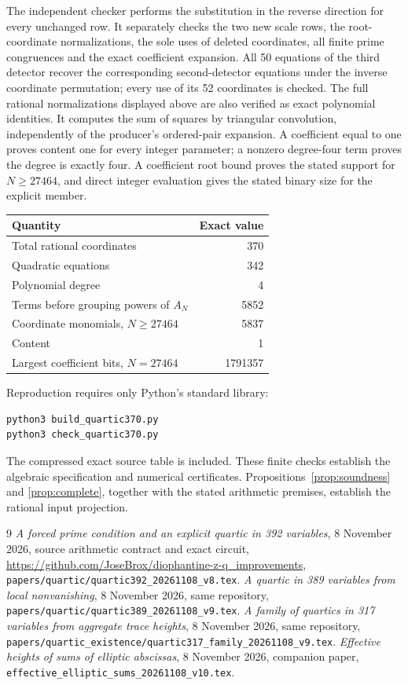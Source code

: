 \documentclass[11pt,a4paper]{article}
\theoremstyle{remark}\newtheorem{remark}[theorem]{Remark}
\begin{document}
The independent checker performs the substitution in the
reverse direction for every unchanged row. It separately
checks the two new scale rows, the root-coordinate
normalizations, the sole uses of deleted coordinates,
all finite prime congruences and the exact coefficient
expansion. All 50 equations of the third detector recover
the corresponding second-detector equations under the inverse
coordinate permutation; every use of its 52 coordinates is
checked. The full rational normalizations displayed above
are also verified as exact polynomial identities.
It computes the sum of squares by triangular
convolution, independently of the producer's ordered-pair
expansion. A coefficient equal to one proves content one
for every integer parameter; a nonzero degree-four term
proves the degree is exactly four. A coefficient root
bound proves the stated support for $N\ge27464$, and direct
integer evaluation gives the stated binary size for the
explicit member.

\begin{center}
\begin{tabular}{lr}
\toprule
Quantity & Exact value\\
\midrule
Total rational coordinates &370\\
Quadratic equations &342\\
Polynomial degree &4\\
Terms before grouping powers of $A_N$ &5852\\
Coordinate monomials, $N\ge27464$ &5837\\
Content &1\\
Largest coefficient bits, $N=27464$ &1791357\\
\bottomrule
\end{tabular}
\end{center}

Reproduction requires only Python's standard library:
\begin{verbatim}
python3 build_quartic370.py
python3 check_quartic370.py
\end{verbatim}
The compressed exact source table is included. These finite
checks establish the algebraic specification and numerical
certificates. Propositions~\ref{prop:soundness} and
\ref{prop:complete}, together with the stated arithmetic
premises, establish the rational input projection.

\begin{thebibliography}{9}
\emph{A forced prime condition and an explicit quartic in 392 variables},
8 November 2026, source arithmetic contract and exact circuit,
\url{https://github.com/JoseBrox/diophantine-z-q_improvements},
\nolinkurl{papers/quartic/quartic392_20261108_v8.tex}.
\emph{A quartic in 389 variables from local nonvanishing},
8 November 2026, same repository,
\nolinkurl{papers/quartic/quartic389_20261108_v9.tex}.
\emph{A family of quartics in 317 variables from aggregate trace heights},
8 November 2026, same repository,
\nolinkurl{papers/quartic_existence/quartic317_family_20261108_v9.tex}.
\emph{Effective heights of sums of elliptic abscissas},
8 November 2026, companion paper,
\nolinkurl{effective_elliptic_sums_20261108_v10.tex}.
\end{thebibliography}
\end{document}
